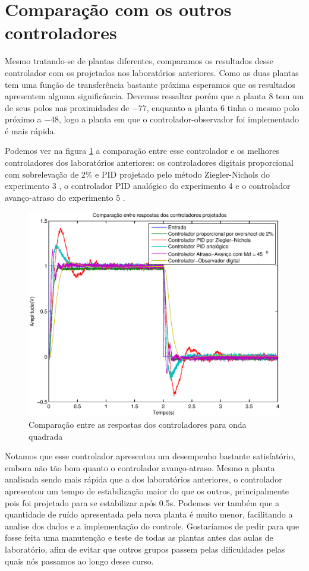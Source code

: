 \documentclass{article}
\begin{document}
\section{Comparação com os outros controladores}

Mesmo tratando-se de plantas diferentes, comparamos os resultados desse controlador com os projetados nos laboratórios anteriores. Como as duas plantas tem uma função de transferência bastante próxima esperamos que os resultados apresentem alguma significância. Devemos ressaltar porém que a planta $8$ tem um de seus polos nas proximidades de $-77$, enquanto a planta $6$ tinha o mesmo polo próximo a $-48$, logo a planta em que o controlador-observador foi implementado é mais rápida.

Podemos ver na figura \ref{fig:yrcomp} a comparação entre esse controlador e os melhores controladores dos laboratórios anteriores: os controladores digitais proporcional com sobrelevação de 2\% e PID projetado pelo método Ziegler-Nichols do experimento 3 \cite{bb:lab3}, o controlador PID analógico do experimento 4 \cite{bb:lab4} e o controlador avanço-atraso do experimento 5 \cite{bb:lab5}.
\begin{figure}[H]
	\centering
	\includegraphics[width=0.8\linewidth]{../yrcomp}
	\caption{Comparação entre as respostas dos controladores para onda quadrada}
	\label{fig:yrcomp}
\end{figure}
Notamos que esse controlador apresentou um desempenho bastante satisfatório, embora não tão bom quanto o controlador avanço-atraso. Mesmo a planta analisada sendo mais rápida que a dos laboratórios anteriores, o controlador apresentou um tempo de estabilização maior do que os outros, principalmente pois foi projetado para se estabilizar após 0.5s. Podemos ver também que a quantidade de ruído apresentada pela nova planta é muito menor, facilitando a analise dos dados e a implementação do controle. Gostaríamos de pedir para que fosse feita uma manutenção e teste de todas as plantas antes das aulas de laboratório, afim de evitar que outros grupos passem pelas dificuldades pelas quais nós passamos ao longo desse curso. 
\end{document}
